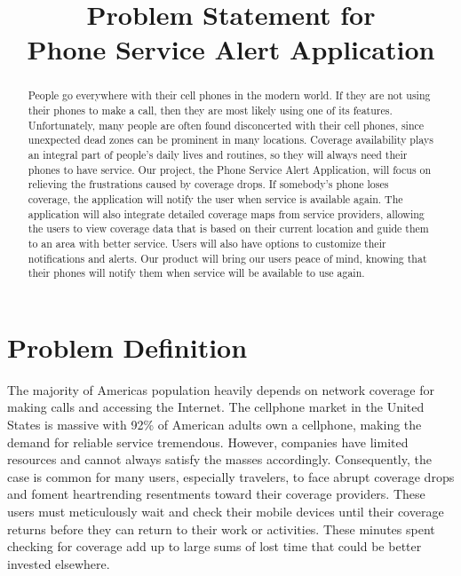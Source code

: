 \documentclass[letterpaper,10pt,draftclsnofoot,onecolumn]{IEEEtran}
\begin{document}
\title{Problem Statement for\\ Phone Service Alert Application}

\author{
}

\maketitle
\begin{abstract}
        People go everywhere with their cell phones in the modern world. If they are not using their phones to make a call, then they are most likely using
        one of its features. Unfortunately, many people are often found disconcerted
        with their cell phones, since unexpected dead zones can be prominent in many locations. 
        Coverage availability plays an integral part of people’s daily lives and routines,
        so they will always need their phones to have service. Our project, the
        Phone Service Alert Application, will focus on relieving the frustrations 
        caused by coverage drops. If somebody's phone loses coverage, the application will
        notify the user when service is available again. The application will also
        integrate detailed coverage maps from service providers,
        allowing the users to view coverage data that is based on their current location and
        guide them to an area with better service. Users will also have
        options to customize their notifications and alerts. Our product will
        bring our users peace of mind, knowing that their phones will notify
        them when service will be available to use again.
\end{abstract}
\pagebreak

\section*{Problem Definition}
The majority of America\textquotesingle s population heavily depends on network coverage for making calls and accessing the Internet. 
The cellphone market in the United States is massive with 92\% of American adults own a cellphone\cite{Zickuhr}, making the demand for reliable service tremendous. 
However, companies have limited resources and cannot always satisfy the masses accordingly. Consequently, the case is common for many users, especially travelers, 
to face abrupt coverage drops and foment heartrending resentments toward their coverage providers. These users must meticulously 
wait and check their mobile devices until their coverage returns before they can return to their work or activities. 
These minutes spent checking for coverage add up to large sums of lost time that could be better invested elsewhere. 
\end{document}
